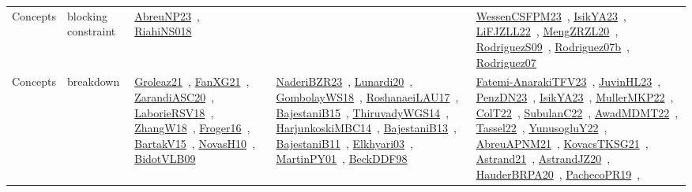 {\begin{longtable}{lp{3cm}>{\raggedright\arraybackslash}p{6cm}>{\raggedright\arraybackslash}p{6cm}>{\raggedright\arraybackslash}p{8cm}}
\index{blocking constraint}\index{Concepts!blocking constraint}Concepts & blocking constraint & \href{../works/AbreuNP23.pdf}{AbreuNP23}~\cite{AbreuNP23}, \href{../works/RiahiNS018.pdf}{RiahiNS018}~\cite{RiahiNS018} &  & \href{../works/WessenCSFPM23.pdf}{WessenCSFPM23}~\cite{WessenCSFPM23}, \href{../works/IsikYA23.pdf}{IsikYA23}~\cite{IsikYA23}, \href{../works/LiFJZLL22.pdf}{LiFJZLL22}~\cite{LiFJZLL22}, \href{../works/MengZRZL20.pdf}{MengZRZL20}~\cite{MengZRZL20}, \href{../works/RodriguezS09.pdf}{RodriguezS09}~\cite{RodriguezS09}, \href{../works/Rodriguez07b.pdf}{Rodriguez07b}~\cite{Rodriguez07b}, \href{../works/Rodriguez07.pdf}{Rodriguez07}~\cite{Rodriguez07}\\
\index{breakdown}\index{Concepts!breakdown}Concepts & breakdown & \href{../works/Groleaz21.pdf}{Groleaz21}~\cite{Groleaz21}, \href{../works/FanXG21.pdf}{FanXG21}~\cite{FanXG21}, \href{../works/ZarandiASC20.pdf}{ZarandiASC20}~\cite{ZarandiASC20}, \href{../works/LaborieRSV18.pdf}{LaborieRSV18}~\cite{LaborieRSV18}, \href{../works/ZhangW18.pdf}{ZhangW18}~\cite{ZhangW18}, \href{../works/Froger16.pdf}{Froger16}~\cite{Froger16}, \href{../works/BartakV15.pdf}{BartakV15}~\cite{BartakV15}, \href{../works/NovasH10.pdf}{NovasH10}~\cite{NovasH10}, \href{../works/BidotVLB09.pdf}{BidotVLB09}~\cite{BidotVLB09} & \href{../works/NaderiBZR23.pdf}{NaderiBZR23}~\cite{NaderiBZR23}, \href{../works/Lunardi20.pdf}{Lunardi20}~\cite{Lunardi20}, \href{../works/GombolayWS18.pdf}{GombolayWS18}~\cite{GombolayWS18}, \href{../works/RoshanaeiLAU17.pdf}{RoshanaeiLAU17}~\cite{RoshanaeiLAU17}, \href{../works/BajestaniB15.pdf}{BajestaniB15}~\cite{BajestaniB15}, \href{../works/ThiruvadyWGS14.pdf}{ThiruvadyWGS14}~\cite{ThiruvadyWGS14}, \href{../works/HarjunkoskiMBC14.pdf}{HarjunkoskiMBC14}~\cite{HarjunkoskiMBC14}, \href{../works/BajestaniB13.pdf}{BajestaniB13}~\cite{BajestaniB13}, \href{../works/BajestaniB11.pdf}{BajestaniB11}~\cite{BajestaniB11}, \href{../works/Elkhyari03.pdf}{Elkhyari03}~\cite{Elkhyari03}, \href{../works/MartinPY01.pdf}{MartinPY01}~\cite{MartinPY01}, \href{../works/BeckDDF98.pdf}{BeckDDF98}~\cite{BeckDDF98} & \href{../works/Fatemi-AnarakiTFV23.pdf}{Fatemi-AnarakiTFV23}~\cite{Fatemi-AnarakiTFV23}, \href{../works/JuvinHL23.pdf}{JuvinHL23}~\cite{JuvinHL23}, \href{../works/PenzDN23.pdf}{PenzDN23}~\cite{PenzDN23}, \href{../works/IsikYA23.pdf}{IsikYA23}~\cite{IsikYA23}, \href{../works/MullerMKP22.pdf}{MullerMKP22}~\cite{MullerMKP22}, \href{../works/ColT22.pdf}{ColT22}~\cite{ColT22}, \href{../works/SubulanC22.pdf}{SubulanC22}~\cite{SubulanC22}, \href{../works/AwadMDMT22.pdf}{AwadMDMT22}~\cite{AwadMDMT22}, \href{../works/Tassel22.pdf}{Tassel22}~\cite{Tassel22}, \href{../works/YunusogluY22.pdf}{YunusogluY22}~\cite{YunusogluY22}, \href{../works/AbreuAPNM21.pdf}{AbreuAPNM21}~\cite{AbreuAPNM21}, \href{../works/KovacsTKSG21.pdf}{KovacsTKSG21}~\cite{KovacsTKSG21}, \href{../works/Astrand21.pdf}{Astrand21}~\cite{Astrand21}, \href{../works/AstrandJZ20.pdf}{AstrandJZ20}~\cite{AstrandJZ20}, \href{../works/HauderBRPA20.pdf}{HauderBRPA20}~\cite{HauderBRPA20}, \href{../works/PachecoPR19.pdf}{PachecoPR19}~\cite{PachecoPR19}, 
\end{longtable}}
